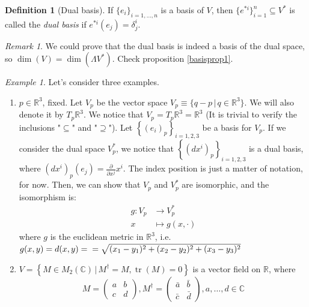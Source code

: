 \documentclass[a4paper,11pt,titlepage]{article}
\numberwithin{equation}{section}
\theoremstyle{definition}
\newtheorem{definition}[theorem]{Definition}
\theoremstyle{remark}
\newtheorem{remark}[theorem]{Remark}
\newtheorem{example}[theorem]{Example}
\DeclareMathOperator{\tr}{tr}
\newcommand{\rfield}{\mathbb{R}}
\begin{document}
\begin{definition}[Dual basis]
If $\{e_i\}_{i=1, \ldots, n}$ is a basis of $V$, then $\{ e^{*i} \}_{i=1}^n \subseteq V^*$ is called the \textit{dual basis} if $e^{*i}(e_j) = \delta^i_j$.
\end{definition}

\begin{remark}
We could prove that the dual basis is indeed a basis of the dual space, so $\dim(V) = \dim(\Lambda V^*)$. Check proposition \ref{basisprop1}.
\end{remark}

\begin{example}
  Let's consider three examples.
  \begin{enumerate}
    \item $p \in \rfield^3$, fixed. Let $V_p$ be the vector space $V_p \equiv \{ q-p \,|\, q \in \rfield^3 \}$. We will also denote it by $T_p\rfield^3$. We notice that $V_p = T_p\rfield^3 = \rfield^3$ (It is trivial to verify the inclusions "$\subseteq$" and "$\supseteq$"). Let $\left \{ (e_i)_p \right \}_{i=1,2,3}$ be a basis for $V_p$. If we consider the dual space $V_p^*$, we notice that $\left \{(dx^i)_p \right\}_{i=1,2,3}$ is a dual basis, where $(dx^i)_p (e_j) = \frac{\partial}{\partial x^j} x^i$. The index position is just a matter of notation, for now. Then, we can show that $V_p$ and $V_p^*$ are isomorphic, and the isomorphism is:
    \begin{align}
      g \colon V_p &\rightarrow V_p^* \\
      x &\mapsto g(x, \cdot) \nonumber
    \end{align}
    where $g$ is the euclidean metric in $\rfield^3$, i.e. $g(x, y) = d(x, y) = \\ = \sqrt{(x_1 - y_1)^2 + (x_2 - y_2)^2 + (x_3 - y_3)^2}$
    \item $V = \left \{ M \in M_2(\mathbb{C}) \, | \, M^{\dagger} = M, \tr(M) = 0 \right \}$ is a vector field on $\rfield$, where
    $$M= \left ( \begin{matrix}
    a &b \\
    c &d
  \end{matrix}\right ), M^{\dagger}= \left (\begin{matrix}
    \bar a &\bar b \\
    \bar c &\bar d
    \end{matrix} \right ), a, \ldots, d \in \mathbb{C}$$


\end{enumerate}
\end{example}
\end{document}
